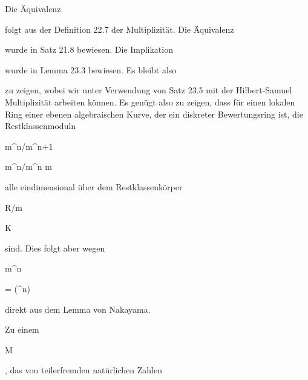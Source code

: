 {


Die Äquivalenz

 folgt aus der
Definition 22.7
der Multiplizität. Die Äquivalenz

 wurde in
Satz 21.8
bewiesen. Die Implikation

 wurde in
Lemma 23.3
bewiesen. Es bleibt also

 zu zeigen, wobei wir unter Verwendung von
Satz 23.5
mit der Hilbert-Samuel Multiplizität arbeiten können. Es genügt also zu zeigen, dass für einen lokalen Ring einer ebenen algebraischen Kurve, der ein diskreter Bewertungsring ist, die Restklassenmoduln


\mavergleichskette

{\vergleichskette

{ {\mathfrak m}^n/{\mathfrak m}^{n+1}
}

{ \cong }{ {\mathfrak m}^n/{\mathfrak m}^{n} {\mathfrak m}
}

{  }{
}

{    }{
}

{   }{
}

}
{}{}{}
alle eindimensional über dem Restklassenkörper


\mavergleichskette

{\vergleichskette

{ R/{\mathfrak m}
}

{ \cong }{ K
}

{  }{
}

{    }{
}

{   }{
}

}
{}{}{}
sind. Dies folgt aber wegen


\mavergleichskette

{\vergleichskette

{ {\mathfrak m}^n
}

{ = }{(\pi^n)
}

{  }{
}

{    }{
}

{   }{
}

}
{}{}{}
direkt
aus dem Lemma von Nakayama.


}




Zu einem


\mavergleichskette

{\vergleichskette

{M
}

{ \subseteq }{ \N
}

{  }{
}

{    }{
}

{   }{
}

}
{}{}{,}
das von teilerfremden natürlichen Zahlen


